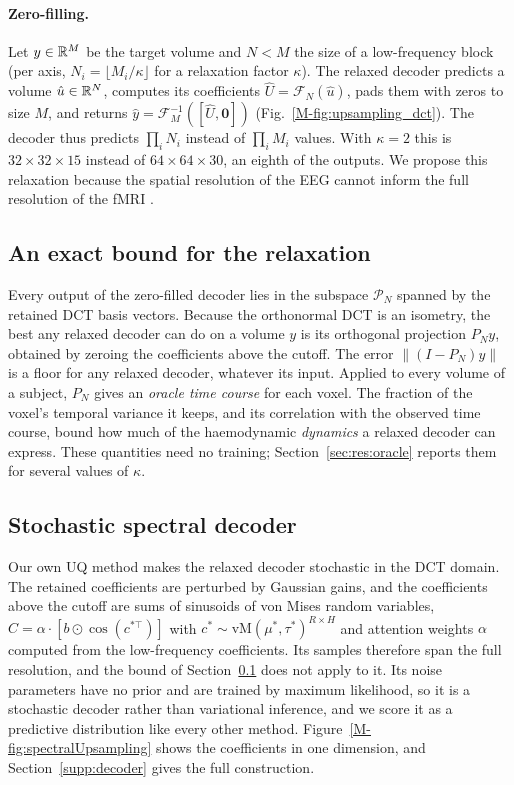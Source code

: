 \paragraph{Zero-filling.} Let $y\in\mathbb{R}^M$ be the target volume and $N<M$ the size of a low-frequency block (per axis, $N_i = \lfloor M_i/\kappa\rfloor$ for a relaxation factor $\kappa$). The relaxed decoder predicts a volume $\hat u\in\mathbb{R}^{N}$, computes its coefficients $\hat U = \mathcal{F}_N(\hat u)$, pads them with zeros to size $M$, and returns $\hat y = \mathcal{F}_M^{-1}([\hat U, \mathbf{0}])$ (Fig.~\ref{M-fig:upsampling_dct}). The decoder thus predicts $\prod_i N_i$ instead of $\prod_i M_i$ values. With $\kappa=2$ this is $32\times32\times15$ instead of $64\times64\times30$, an eighth of the outputs. We propose this relaxation because the spatial resolution of the EEG cannot inform the full resolution of the fMRI \citep{burle2015spatial}.

\subsection{An exact bound for the relaxation}\label{sec:oracle}
Every output of the zero-filled decoder lies in the subspace $\mathcal{P}_N$ spanned by the retained DCT basis vectors. Because the orthonormal DCT is an isometry, the best any relaxed decoder can do on a volume $y$ is its orthogonal projection $P_N y$, obtained by zeroing the coefficients above the cutoff. The error $\|(I-P_N)y\|$ is a floor for any relaxed decoder, whatever its input. Applied to every volume of a subject, $P_N$ gives an \emph{oracle time course} for each voxel. The fraction of the voxel's temporal variance it keeps, and its correlation with the observed time course, bound how much of the haemodynamic \emph{dynamics} a relaxed decoder can express. These quantities need no training; Section~\ref{sec:res:oracle} reports them for several values of $\kappa$.

\subsection{Stochastic spectral decoder}\label{sec:spectral}
Our own UQ method makes the relaxed decoder stochastic in the DCT domain. The retained coefficients are perturbed by Gaussian gains, and the coefficients above the cutoff are sums of sinusoids of von Mises random variables, $C=\alpha\cdot[b\odot\cos(c^{*\top})]$ with $c^*\sim\mathrm{vM}(\mu^*,\tau^*)^{R\times H}$ and attention weights $\alpha$ computed from the low-frequency coefficients. Its samples therefore span the full resolution, and the bound of Section~\ref{sec:oracle} does not apply to it. Its noise parameters have no prior and are trained by maximum likelihood, so it is a stochastic decoder rather than variational inference, and we score it as a predictive distribution like every other method. Figure~\ref{M-fig:spectralUpsampling} shows the coefficients in one dimension, and Section~\ref{supp:decoder} gives the full construction.


